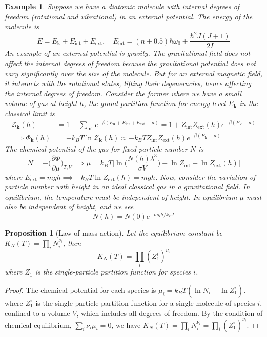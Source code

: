 \documentclass[a4paper]{article}
\newtheorem{eg}{Example}[section]
\theoremstyle{new}
\newtheorem{prop}{Proposition}[section]
\begin{document}
\begin{eg}
Suppose we have a diatomic molecule with internal degrees of freedom (rotational and vibrational) in an external potential. The energy of the molecule is
$$E=E_{\mathbf{k}}+E_{\text{int}}+E_{\text{ext}},\quad E_{\text{int}}=(n+0.5)\hbar\omega_0+\frac{\hbar^2J(J+1)}{2I}$$
An example of an external potential is gravity. The gravitational field does not affect the internal degrees of freedom because the gravitational potential does not vary significantly over the size of the molecule. But for an external magnetic field, it interacts with the rotational states, lifting their degeneracies, hence affecting the internal degrees of freedom. Consider the former where we have a small volume of gas at height $h$, the grand partition function for energy level $E_{\mathbf{k}}$ in the classical limit is
\begin{align}
\mathcal{Z}_{\mathbf{k}}(h)&=1+\sum_{\text{int}}e^{-\beta(E_{\mathbf{k}}+E_{\text{int}}+E_{\text{ext}}-\mu)}=1+Z_{\text{int}}Z_{\text{ext}}(h)e^{-\beta(E_{\mathbf{k}}-\mu)}\nonumber\\\implies\Phi_{\mathbf{k}}(h)&=-k_BT\ln\mathcal{Z}_{\mathbf{k}}(h)\approx-k_BTZ_{\text{int}}Z_{\text{ext}}(h)e^{-\beta(E_{\mathbf{k}}-\mu)}\nonumber
\end{align}
The chemical potential of the gas for fixed particle number $N$ is
$$N=-\bigg(\frac{\partial\Phi}{\partial\mu}\bigg)_{T,V}\implies\mu=k_BT\bigg[\ln\bigg(\frac{N(h)\lambda^3}{\sigma V}\bigg)-\ln Z_{\text{int}}-\ln Z_{\text{ext}}(h)\bigg]$$
where $E_{\text{ext}}=mgh\implies-k_BT\ln Z_{\text{ext}}(h)=mgh$. Now, consider the variation of particle number with height in an ideal classical gas in a gravitational field. In equilibrium, the temperature must be independent of height. In equilibrium $\mu$ must also be independent of height, and we see 
$$N(h)=N(0)e^{-mgh/k_BT}$$
\end{eg}
\begin{prop}[Law of mass action]
Let the equilibrium constant be $K_N(T)=\prod_iN_i^{\nu_i}$, then
$$K_N(T)=\prod_i(Z_1^i)^{\nu_i}$$
where $Z_1$ is the single-particle partition function for species $i$.
\end{prop}
\begin{proof}
The chemical potential for each species is $\mu_i=k_BT(\ln N_i-\ln Z_1^i)$. where $Z_1^i$ is the single-particle partition function for a single molecule of species $i$, confined to a volume $V$, which includes all degrees of freedom. By the condition of chemical equilibrium, $\sum_i\nu_i\mu_i=0$, we have $K_N(T)=\prod_iN_i^{\nu_i}=\prod_i(Z_1^i)^{\nu_i}$.
\end{proof}
\end{document}
